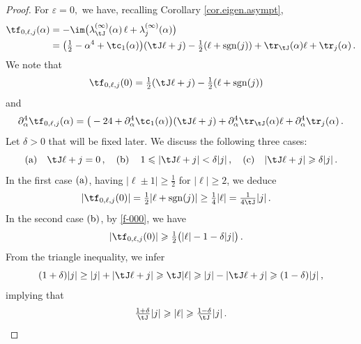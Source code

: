 \documentclass[a4paper,reqno,10pt]{article}
\newcommand{\pa}{\partial}
\begin{document}
\begin{proof}
    For $\varepsilon=0,$ we have, recalling Corollary \ref{cor.eigen.asympt},
	\begin{align}
			\tf_{0,\ell,j}(\alpha) & = -\im\big( \lambda_{\tJ}^{(\infty)}(\alpha)\,\ell + \lambda_{j}^{(\infty)}(\alpha)\big) \\
			& =	\big(\tfrac12 - \alpha^4+\tc_{1}(\alpha) \big)(\tJ \ell + j) - \tfrac12 (\ell +{\rm sgn}(j) ) +  \tr_{\tJ}(\alpha) \ell + \tr_{j}(\alpha)		\,.\label{f-o0}
	\end{align}
	 We note that
     \begin{align}\label{f-000}
			\tf_{0,\ell,j}(0) 
			& =	\tfrac12 (\tJ \ell + j) - \tfrac12 (\ell +{\rm sgn}(j))
	\end{align}
    and 
     \begin{equation}
		\pa_{\alpha}^4\tf_{0,\ell,j}(\alpha) =\big(- 24 + \pa_{\alpha}^4\tc_{1}(\alpha) \big)(\tJ \ell +j) +\pa_{\alpha}^4 \tr_{\tJ}(\alpha) \ell + \pa_{\alpha}^4 \tr_{j}(\alpha)\,.
	\end{equation}
     Let $\delta>0$ that will be fixed later. We discuss the following three cases:
     \begin{equation}\label{abc.cases}
          ({\rm a})\quad  \tJ\ell+j=0\,,\quad ({\rm b}) \quad \, 1\leqslant |\tJ\ell+j|<\delta |j|\,, \quad ({\rm c})\quad |\tJ\ell+j|\geqslant\delta |j|\,.
     \end{equation}
     In the first case $({\rm a})$, having $|\ell\pm 1|\geq \tfrac12$ for $|\ell|\geqslant2$, we deduce
     \begin{align}
			|\tf_{0,\ell,j}(0)| 
			& =	  \tfrac12 |\ell +{\rm sgn}(j)|  \geq \tfrac14 |\ell| = \tfrac{1}{4 \tJ}|j|\,. \label{Ineq-tran1}
	\end{align}
    In the second case $({\rm b})$, by \eqref{f-000}, we have
    \begin{align*}
			|\tf_{0,\ell,j}(0)| 
			& \geqslant \tfrac12\big(|\ell|-1-\delta |j|\big)\,.
	\end{align*}
    From the triangle inequality, we infer
    \begin{equation}
        (1+\delta)|j| \geq |j| + |\tJ \ell + j|  \geqslant \tJ|\ell|\geqslant |j|-|\tJ\ell+j|\geqslant (1-\delta)|j| \,,
    \end{equation}
    implying that
    \begin{align}\label{ell-to-j}
    \tfrac{1+\delta}{\tJ}|j|\geqslant |\ell|\geqslant \tfrac{1-\delta}{\tJ} |j|\,.\end{align}

\end{proof}
\end{document}
